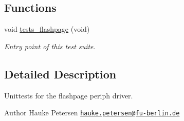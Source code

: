 \subsection*{Functions}
\begin{DoxyCompactItemize}
\item 
void \hyperlink{group__unittests_ga4e4d5da67e11b5dccfc097568ed36d82}{tests\+\_\+flashpage} (void)
\begin{DoxyCompactList}\small\item\em Entry point of this test suite. \end{DoxyCompactList}\end{DoxyCompactItemize}


\subsection{Detailed Description}
Unittests for the {\ttfamily flashpage} periph driver. 

\begin{DoxyAuthor}{Author}
Hauke Petersen \href{mailto:hauke.petersen@fu-berlin.de}{\tt hauke.\+petersen@fu-\/berlin.\+de} 
\end{DoxyAuthor}
